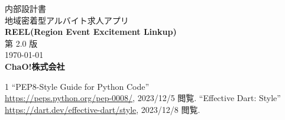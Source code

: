 \documentclass[a4paper,dvipdfmx]{jarticle}
\begin{document}
\begin{titlepage}
  \centering
  \LARGE
  内部設計書
  \\\vspace{3cm}
  地域密着型アルバイト求人アプリ\\
  \textbf{REEL(Region Event Excitement Linkup)}
  \\\vspace{4cm}
  第 2.0 版
  \\\vspace{4cm}
  \today
  \\\vspace{2.5cm}
  \textbf{ChaO!株式会社}
\end{titlepage}
\tableofcontents
\newpage








\begin{thebibliography}{1}
  ``PEP8-Style Guide for Python Code''\\
  \url{https://peps.python.org/pep-0008/}, 2023/12/5 閲覧.
  ``Effective Dart: Style''\\
  \url{https://dart.dev/effective-dart/style}, 2023/12/8 閲覧.
\end{thebibliography}
\end{document}
